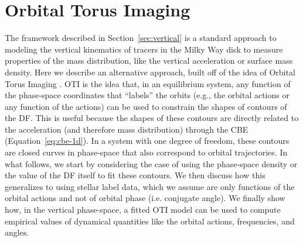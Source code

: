 \section{Orbital Torus Imaging} \label{sec:oti}


The framework described in Section~\ref{sec:vertical} is a standard approach to modeling
the vertical kinematics of tracers in the Milky Way disk to measure properties of the
mass distribution, like the vertical acceleration or surface mass density.
Here we describe an alternative approach, built off of the idea of Orbital Torus Imaging
\citep[OTI;][]{Price-Whelan:2021}.
OTI is the idea that, in an equilibrium system, any function of the phase-space
coordinates that ``labels'' the orbits (e.g., the orbital actions or any function of
the actions) can be used to constrain the shapes of contours of the DF.
This is useful because the shapes of these contours are directly related to the
acceleration (and therefore mass distribution) through the CBE
(Equation~\ref{eq:cbe-1d}).
In a system with one degree of freedom, these contours are closed curves in phase-space
that also correspond to orbital trajectories.
In what follows, we start by considering the case of using the phase-space density or
the value of the DF itself to fit these contours.
We then discuss how this generalizes to using stellar label data, which we assume are
only functions of the orbital actions and not of orbital phase (i.e. conjugate angle).
We finally show how, in the vertical phase-space, a fitted OTI model can be used to
compute empirical values of dynamical quantities like the orbital actions, frequencies,
and angles.


